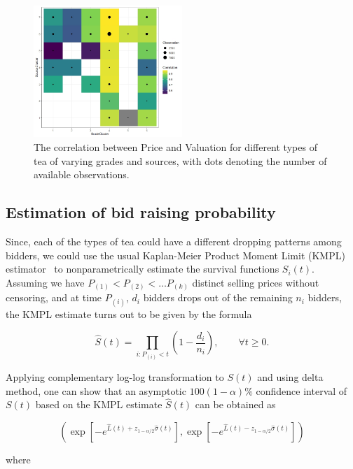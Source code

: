 \documentclass[a4paper,12pt]{article}
\begin{document}
\begin{figure}[ht]
    \centering
    \includegraphics[width =0.5\textwidth]{figures/corrplot.jpeg}
    \caption{The correlation between Price and Valuation for different types of tea of varying grades and sources, with dots denoting the number of available observations.}
    \label{fig:corrplot}
\end{figure}

\subsection{Estimation of bid raising probability}

Since, each of the types of tea could have a different dropping patterns among bidders, we could use the usual Kaplan-Meier Product Moment Limit (KMPL) estimator~\cite{kleinbaum2010survival} to nonparametrically estimate the survival functions $S_i(t)$. Assuming we have $P_{(1)} < P_{(2)} < \dots P_{(k)}$ distinct selling prices without censoring, and at time $P_{(i)}$, $d_i$ bidders drops out of the remaining $n_i$ bidders, the KMPL estimate turns out to be given by the formula

$$
\widehat{S}(t) = \prod_{i : P_{(i)} < t} \left(  1 - \dfrac{d_i}{n_i} \right), \qquad \forall t \geq 0.
$$

\noindent Applying complementary log-log transformation to $S(t)$ and using delta method, one can show that an asymptotic $100(1-\alpha)\%$ confidence interval of $S(t)$ based on the KMPL estimate $\widehat{S}(t)$ can be obtained as 

\begin{equation*}
    \left( \exp\left[ -e^{\widehat{L}(t) + z_{1-\alpha/2}\widehat{\sigma}(t)} \right], \exp\left[ -e^{\widehat{L}(t) - z_{1-\alpha/2}\widehat{\sigma}(t)} \right] \right)
\end{equation*}

\noindent where 
\end{document}
